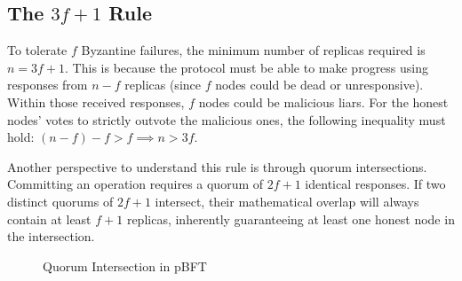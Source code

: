 
\subsection{The $3f+1$ Rule}
To tolerate $f$ Byzantine failures, the minimum number of replicas required is $n = 3f+1$. This is because the protocol must be able to make progress using responses from $n - f$ replicas (since $f$ nodes could be dead or unresponsive). Within those received responses, $f$ nodes could be malicious liars. For the honest nodes' votes to strictly outvote the malicious ones, the following inequality must hold: $(n - f) - f > f \implies n > 3f$.

Another perspective to understand this rule is through quorum intersections. Committing an operation requires a quorum of $2f+1$ identical responses. If two distinct quorums of $2f+1$ intersect, their mathematical overlap will always contain at least $f+1$ replicas, inherently guaranteeing at least one honest node in the intersection.

\begin{figure}[H]
\centering
{}
\caption{Quorum Intersection in pBFT}
\end{figure}